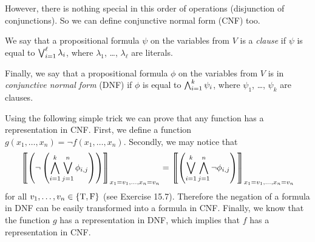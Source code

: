 However, there is nothing special in this order of operations (disjunction of
conjunctions). So we can define conjunctive normal form (CNF) too.
\begin{definition}
  We say that a propositional formula $\psi$ on the variables from $V$ is
  a \emph{clause} if $\psi$ is equal to $\bigvee_{i = 1}^\ell \lambda_i$, where
  $\lambda_1$, \dots, $\lambda_\ell$ are literals.

  Finally, we say that a propositional formula $\phi$ on the variables from
  $V$ is in \emph{conjunctive normal form} (DNF) if $\phi$ is equal to
  $\bigwedge_{i = 1}^k \psi_i$, where $\psi_1$, \dots, $\psi_k$ are
  clauses.
\end{definition}

Using the following simple trick we can prove that any function
has a representation in CNF. First, we define a function
$g(x_1, \dots, x_n) = \lnot f(x_1, \dots, x_n)$. Secondly, we may notice that
\[
  \left\llbracket {
    \left(
      \lnot
      \left(
        \bigwedge_{i = 1}^k \bigvee_{j = 1}^n \phi_{i, j}
      \right)
    \right)
  } \right\rrbracket_{x_1 = v_1, \dots, x_n = v_n}
  =
  \left\llbracket {
    \left(
      \bigvee_{i = 1}^k \bigwedge_{j = 1}^n \lnot \phi_{i, j}
    \right)
  } \right\rrbracket_{x_1 = v_1, \dots, x_n = v_n}
\]
for all $v_1, \dots, v_n \in \set{\ltrue, \lfalse}$
(see Exercise 15.7). Therefore the negation
of a formula in DNF can be easily transformed into a formula in CNF.
Finally, we know that the function
$g$ has a representation in DNF, which implies that $f$ has a representation
in CNF.


